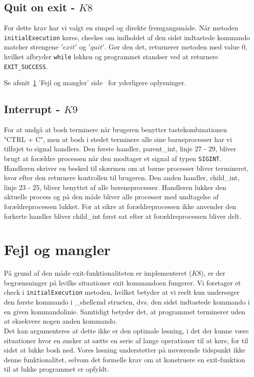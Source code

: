 \documentclass{article}
\begin{document}
\subsection{Quit on exit - $K8$}
For dette krav har vi valgt en simpel og direkte fremgangsmåde. Når metoden \texttt{initialExecution} køres, checkes om indholdet af den sidst indtastede kommando matcher strengene $'exit'$ og $'quit'$. Gør den det, returnerer metoden med value $0$, hvilket afbryder \texttt{while} løkken og programmet standser ved at returnere \texttt{EXIT\_SUCCESS}.

Se afsnit~\ref{sec:fm} 'Fejl og mangler' side~\pageref{sec:fm} for yderligere oplysninger.

\subsection{Interrupt - $K9$}
For at undgå at bosh terminere når brugeren benytter tastekombinationen "CTRL + C", men at bosh i stedet terminere alle sine barneprocesser har vi tilføjet to signal handlers. Den første handler, parent\_int, linje 27 - 29, bliver brugt at forældre processen når den modtager et signal af typen \texttt{SIGINT}. Handleren skriver en besked til skærmen om at børne processer bliver termineret, hvor efter den returnere kontrollen til brugeren. 
Den anden handler, child\_int, linje 23 - 25, bliver benyttet af alle børeneprocesser. Handleren lukker den aktuelle process og på den måde bliver alle processer med undtagelse af forældreprocessen lukket. For at sikre at forældreprocessen ikke anvender den forkerte handler bliver child\_int først sat efter at forældreprocessen bliver delt.\\

\section{Fejl og mangler}
\label{sec:fm}
På grund af den måde exit-funktionaliteten er implementeret ($K8$), er der begrænsninger på hvilke situationer exit kommandoen fungerer. Vi foretager et check i \texttt{initialExecution} metoden, hvilket betyder at vi reelt kun undersøger den første kommando i \_shellcmd structen, dvs. den sidst indtastede kommando i en given kommandolinie. Samtidigt betyder det, at programmet terminerer uden at eksekvere nogen anden kommando.\\

Det kan argumenteres at dette ikke er den optimale løsning, i det der kunne være situationer hvor en ønsker at sætte en serie af lange operationer til at køre, for til sidst at lukke bosh ned. Vores løsning understøtter på nuværende tidspunkt ikke denne funktionalitet, selvom det formelle krav om at konstruere en exit-funktion til at lukke programmet er opfyldt.
\end{document}
